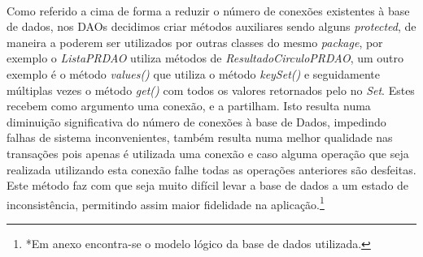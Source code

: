 \documentclass[a4paper,12pt]{report}
\begin{document}
\\\indent Como referido a cima de forma a reduzir o número de conexões existentes à  base de dados, nos DAOs decidimos criar métodos auxiliares sendo alguns \emph{protected}, de maneira a poderem ser utilizados por outras classes do mesmo \emph{package}, por exemplo o \emph{ListaPRDAO} utiliza métodos de \emph{ResultadoCirculoPRDAO}, um outro exemplo é o método \emph{values()} que utiliza o método \emph{keySet()} e seguidamente múltiplas vezes o método \emph{get()} com todos os valores retornados pelo no \emph{Set}. Estes recebem como argumento uma conexão, e a partilham. Isto resulta numa diminuição significativa do número de conexões à base de Dados, impedindo falhas de sistema inconvenientes, também resulta numa melhor qualidade nas transações pois apenas é utilizada uma conexão e caso alguma operação que seja realizada utilizando esta conexão falhe todas as operações anteriores são desfeitas. Este método faz com que seja muito difícil levar a base de dados a um estado de inconsistência, permitindo assim maior fidelidade na aplicação.\footnote{*Em anexo encontra-se o modelo lógico da base de dados utilizada.}
\newpage
\end{document}
